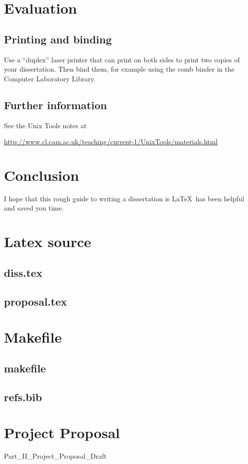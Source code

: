 \documentclass[12pt,a4paper,twoside,openright]{report}
\begin{document}
	
	\chapter{Evaluation}
	
	\section{Printing and binding}
	
	Use a ``duplex'' laser printer that can print on both sides to print
	two copies of your dissertation. Then bind them, for example using the
	comb binder in the Computer Laboratory Library.
	
	\section{Further information}
	
	See the Unix Tools notes at
	
	\url{http://www.cl.cam.ac.uk/teaching/current-1/UnixTools/materials.html}
	
	
	\chapter{Conclusion}
	
	I hope that this rough guide to writing a dissertation is \LaTeX\ has
	been helpful and saved you time.
	
	
	
	
	\appendix
	
	\chapter{Latex source}
	
	\section{diss.tex}
	{\scriptsize}
	
	\section{proposal.tex}
	{\scriptsize}
	
	\chapter{Makefile}
	
	\section{makefile}\label{makefile}
	{\scriptsize}
	
	\section{refs.bib}
	{\scriptsize}
	
	
	\chapter{Project Proposal}
	
	{Part_II_Project_Proposal_Draft}
	
	
\end{document}
